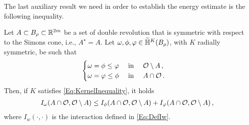 The last auxiliary result we need in order to establish the energy estimate is the following inequality.

\begin{lemma}
\label{Lemma:InteractionInequalityMinimumFunction}
Let $A\subset B_\rho \subset \mathbb{R}^{2m}$ be a set of double revolution that is symmetric with respect to the Simons cone, i.e., $A^\star = A$. Let $\omega, \phi, \varphi \in \widetilde{\mathbb{H}}^K(B_\rho)$, with $K$ radially symmetric, be such that
\begin{equation}
	\label{Eq:InteractionMinHyp}
	\begin{cases}
	\omega = \phi \leq \varphi \ \ \ \ \textrm{in } \ \ \ \mathcal{O} \setminus A\,,\\
	\omega = \varphi \leq \phi \ \ \ \ \textrm{in } \ \ \ A \cap \mathcal{O}\,.
	\end{cases}
\end{equation}
Then, if $K$ satisfies \eqref{Eq:KernelInequality}, it holds
\begin{align*}
I_\omega(A \cap \mathcal{O}, \mathcal{O} \setminus A) \leq I_\phi(A \cap \mathcal{O}, \mathcal{O} \setminus A) + I_\varphi(A \cap \mathcal{O}, \mathcal{O} \setminus A)\,,
\end{align*}
where $I_w(\cdot, \cdot)$ is the interaction defined in \eqref{Eq:DefIw}.
\end{lemma}

